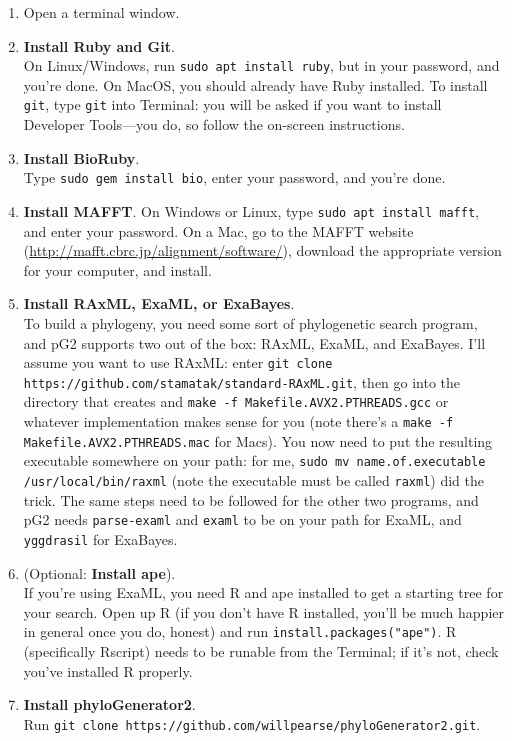 \documentclass[12pt]{article}
\begin{document}
\begin{enumerate}
\item Open a terminal window.
\item \textbf{Install Ruby and Git}. \\On Linux/Windows, run
  \texttt{sudo apt install ruby}, but in your password, and you're
  done. On MacOS, you should already have Ruby installed. To install
  \texttt{git}, type \texttt{git} into Terminal: you will be asked if you want to install Developer Tools---you do, so follow the on-screen instructions.
\item \textbf{Install BioRuby}. \\Type \texttt{sudo gem install bio},
  enter your password, and you're done.
\item \textbf{Install MAFFT}. On Windows or Linux, type \texttt{sudo
    apt install mafft}, and enter your password. On a Mac, go to the
  MAFFT website (\url{http://mafft.cbrc.jp/alignment/software/}),
  download the appropriate version for your computer, and install.
\item \textbf{Install RAxML, ExaML, or ExaBayes}. \\To build a
  phylogeny, you need some sort of phylogenetic search program, and
  pG2 supports two out of the box: RAxML, ExaML, and ExaBayes. I'll
  assume you want to use RAxML: enter \texttt{git clone
    https://github.com/stamatak/standard-RAxML.git}, then go into the
  directory that creates and \texttt{make -f
    Makefile.AVX2.PTHREADS.gcc} or whatever implementation makes sense
  for you (note there's a \texttt{make -f Makefile.AVX2.PTHREADS.mac}
  for Macs). You now need to put the resulting executable somewhere on
  your path: for me, \texttt{sudo mv name.of.executable
    /usr/local/bin/raxml} (note the executable must be called
  \texttt{raxml}) did the trick. The same steps need to be followed
  for the other two programs, and pG2 needs \texttt{parse-examl} and
  \texttt{examl} to be on your path for ExaML, and \texttt{yggdrasil}
  for ExaBayes.
\item (Optional: \textbf{Install ape}). \\If you're using ExaML, you
  need R and ape installed to get a starting tree for your
  search. Open up R (if you don't have R installed, you'll be much
  happier in general once you do, honest) and run
  \texttt{install.packages("ape")}. R (specifically Rscript) needs to
  be runable from the Terminal; if it's not, check you've installed R
  properly.
\item \textbf{Install phyloGenerator2}. \\ Run \texttt{git clone
    https://github.com/willpearse/phyloGenerator2.git}.
\end{enumerate}
\end{document}
